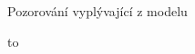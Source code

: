 \documentclass[handouts]{beamer}
\begin{document}
\begin{frame}
\begin{block}{Pozorování vyplývající z modelu}
\begin{itemize}
\end{itemize}
\end{block}

\hbox to 

\end{frame}
\end{document}
